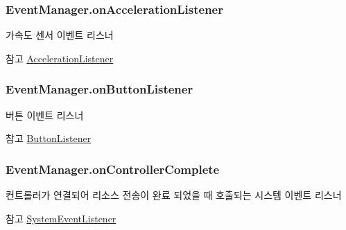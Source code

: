 \subsubsection[{on\+Acceleration\+Listener}]{ Event\+Manager.\+on\+Acceleration\+Listener}\label{class_event_manager_a653a885d332bd10bf53a1f8e6a8c36cd}
가속도 센서 이벤트 리스너 \begin{DoxySeeAlso}{참고}
\hyperlink{class_event_manager_ac459bcb4ba4f140243e271628f8d366c}{Acceleration\+Listener} 
\end{DoxySeeAlso}
\hypertarget{class_event_manager_a6f4d5e2ed1262c99f3295743878ba681}{}
\subsubsection[{on\+Button\+Listener}]{ Event\+Manager.\+on\+Button\+Listener}\label{class_event_manager_a6f4d5e2ed1262c99f3295743878ba681}
버튼 이벤트 리스너 \begin{DoxySeeAlso}{참고}
\hyperlink{class_event_manager_ae17715b9a94a50d9a8e1f29580af7c16}{Button\+Listener} 
\end{DoxySeeAlso}
\hypertarget{class_event_manager_af12f0caee161b1b2222cfd13cd957750}{}
\subsubsection[{on\+Controller\+Complete}]{ Event\+Manager.\+on\+Controller\+Complete}\label{class_event_manager_af12f0caee161b1b2222cfd13cd957750}
컨트롤러가 연결되어 리소스 전송이 완료 되었을 때 호출되는 시스템 이벤트 리스너 \begin{DoxySeeAlso}{참고}
\hyperlink{class_event_manager_a65e017fcb7c22959f09becc40ad3bc2d}{System\+Event\+Listener} 
\end{DoxySeeAlso}
\hypertarget{class_event_manager_a1982ee974be3949930955adbf2b69416}{}
